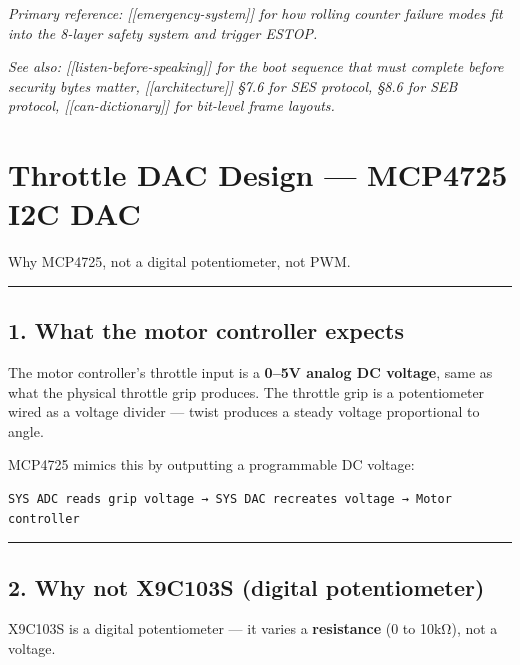 \documentclass[12pt,a4paper,oneside]{report}
\begin{document}
\emph{Primary reference: {[}{[}emergency-system{]}{]} for how rolling counter
failure modes fit into the 8-layer safety system and trigger ESTOP.}

\emph{See also: {[}{[}listen-before-speaking{]}{]} for the boot sequence that
must complete before security bytes matter, {[}{[}architecture{]}{]} §7.6 for
SES protocol, §8.6 for SEB protocol, {[}{[}can-dictionary{]}{]} for bit-level
frame layouts.}


\chapter{Throttle DAC Design --- MCP4725 I2C
DAC}\label{throttle-dac-design-mcp4725-i2c-dac}

Why MCP4725, not a digital potentiometer, not PWM.

\begin{center}\rule{0.5\linewidth}{0.5pt}\end{center}

\section{1. What the motor controller
expects}\label{what-the-motor-controller-expects}

The motor controller's throttle input is a \textbf{0--5V analog DC voltage},
same as what the physical throttle grip produces. The throttle grip is a
potentiometer wired as a voltage divider --- twist produces a steady voltage
proportional to angle.

MCP4725 mimics this by outputting a programmable DC voltage:

\begin{verbatim}
SYS ADC reads grip voltage → SYS DAC recreates voltage → Motor controller
\end{verbatim}

\begin{center}\rule{0.5\linewidth}{0.5pt}\end{center}

\section{2. Why not X9C103S (digital
potentiometer)}\label{why-not-x9c103s-digital-potentiometer}

X9C103S is a digital potentiometer --- it varies a \textbf{resistance} (0 to
10kΩ), not a voltage.
\end{document}
